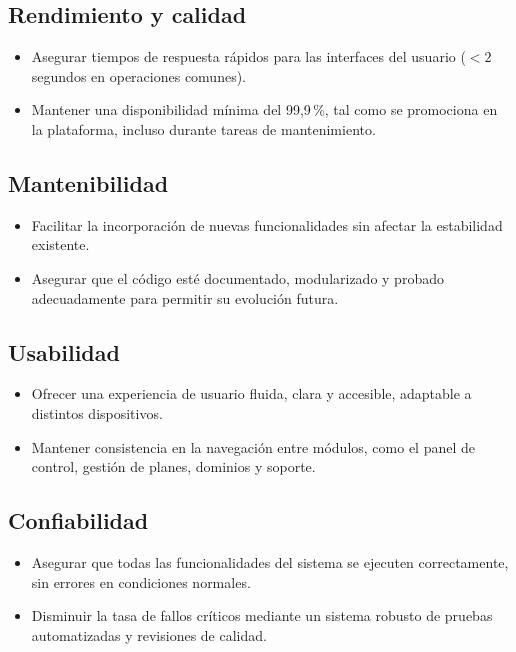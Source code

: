\documentclass[12pt,a4paper]{article}
\begin{document}
\subsection{Rendimiento y calidad}

\begin{itemize}
  \item Asegurar tiempos de respuesta rápidos para las interfaces del usuario ($< 2$ segundos
        en operaciones comunes).
  \item Mantener una disponibilidad mínima del 99,9\,\%, tal como se promociona en la
        plataforma, incluso durante tareas de mantenimiento.
\end{itemize}

\subsection{Mantenibilidad}

\begin{itemize}
  \item Facilitar la incorporación de nuevas funcionalidades sin afectar la estabilidad
        existente.
  \item Asegurar que el código esté documentado, modularizado y probado adecuadamente
        para permitir su evolución futura.
\end{itemize}

\subsection{Usabilidad}

\begin{itemize}
  \item Ofrecer una experiencia de usuario fluida, clara y accesible, adaptable a distintos
        dispositivos.
  \item Mantener consistencia en la navegación entre módulos, como el panel de control,
        gestión de planes, dominios y soporte.
\end{itemize}

\subsection{Confiabilidad}

\begin{itemize}
  \item Asegurar que todas las funcionalidades del sistema se ejecuten correctamente, sin
        errores en condiciones normales.
  \item Disminuir la tasa de fallos críticos mediante un sistema robusto de pruebas
        automatizadas y revisiones de calidad.
\end{itemize}
\end{document}
